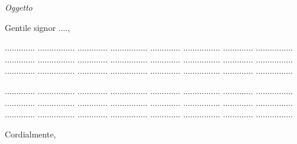 \documentclass[12pt,a4paper]{letter}
\date{20 settembre 2025}
\begin{document}
\begin{letter}{\textit{Oggetto}}

\opening{Gentile signor ....,}

............. ................ ............. ................
............. ................ ............. ................
............. ................ ............. ................
............. ................ ............. ................
............. ................ ............. ................
............. ................ ............. ................

............. ................ ............. ................
............. ................ ............. ................
............. ................ ............. ................
............. ................ ............. ................
............. ................ ............. ................
............. ................ ............. ................

\vspace{1 cm}

\closing{Cordialmente,}


\end{letter}
\end{document}
